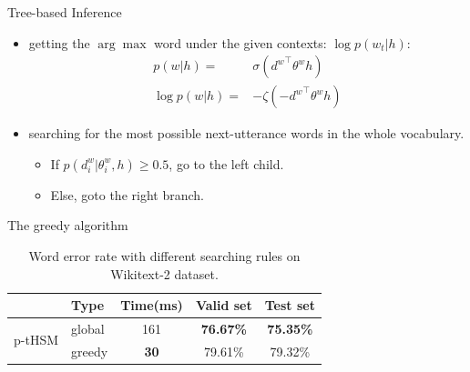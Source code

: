 \documentclass[english]{beamer} %
\begin{document}
\begin{frame}[<+->]{Tree-based Inference}
\begin{itemize}
  \item getting the $\arg\max$ word under the given contexts: $\log p(w_t|h)$:
  \begin{equation}
\begin{split}
    p(w|h) =&\sigma({d^w}^\top \theta^w h)\\
   \log p(w|h) =& -\zeta(- {d^{w}}^\top \theta^{w} h )
\end{split}
\end{equation}
  \item searching for the most possible next-utterance words in the whole vocabulary.
  \begin{itemize}
  \item If $p(d^w_i |\theta_{i}^w,h) \ge 0.5$, go to the left child.
  \item Else, goto the right branch.
   \end{itemize}
\end{itemize}
\end{frame}




\begin{frame}[<+->]{The greedy algorithm}
\begin{table}[!t]
\setlength{\abovecaptionskip}{0pt}
\setlength{\abovedisplayskip}{0pt}
  \centering
  \caption{Word error rate with different searching rules on Wikitext-2 dataset.\label{tab:search}}
\begin{tabular}{llccc}
  \toprule
   & Type&Time(ms)&Valid set & Test set \\ \midrule
  \multirow{2}{*}{p-tHSM}                  &global&161& \textbf{76.67\%}&\textbf{75.35\%}\\
        &greedy&\textbf{30} & 79.61\%&79.32\%\\
  \bottomrule
\end{tabular}
\end{table}
\end{frame}
\end{document}
